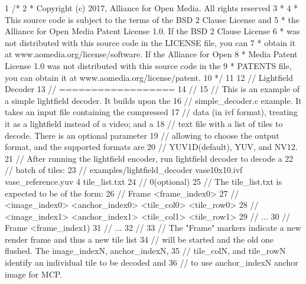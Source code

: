 \begin{DoxyCodeInclude}
1 \textcolor{comment}{/*}
2 \textcolor{comment}{ * Copyright (c) 2017, Alliance for Open Media. All rights reserved}
3 \textcolor{comment}{ *}
4 \textcolor{comment}{ * This source code is subject to the terms of the BSD 2 Clause License and}
5 \textcolor{comment}{ * the Alliance for Open Media Patent License 1.0. If the BSD 2 Clause License}
6 \textcolor{comment}{ * was not distributed with this source code in the LICENSE file, you can}
7 \textcolor{comment}{ * obtain it at www.aomedia.org/license/software. If the Alliance for Open}
8 \textcolor{comment}{ * Media Patent License 1.0 was not distributed with this source code in the}
9 \textcolor{comment}{ * PATENTS file, you can obtain it at www.aomedia.org/license/patent.}
10 \textcolor{comment}{ */}
11 
12 \textcolor{comment}{// Lightfield Decoder}
13 \textcolor{comment}{// ==================}
14 \textcolor{comment}{//}
15 \textcolor{comment}{// This is an example of a simple lightfield decoder. It builds upon the}
16 \textcolor{comment}{// simple\_decoder.c example.  It takes an input file containing the compressed}
17 \textcolor{comment}{// data (in ivf format), treating it as a lightfield instead of a video; and a}
18 \textcolor{comment}{// text file with a list of tiles to decode. There is an optional parameter}
19 \textcolor{comment}{// allowing to choose the output format, and the supported formats are}
20 \textcolor{comment}{// YUV1D(default), YUV, and NV12.}
21 \textcolor{comment}{// After running the lightfield encoder, run lightfield decoder to decode a}
22 \textcolor{comment}{// batch of tiles:}
23 \textcolor{comment}{// examples/lightfield\_decoder vase10x10.ivf vase\_reference.yuv 4 tile\_list.txt}
24 \textcolor{comment}{// 0(optional)}
25 \textcolor{comment}{// The tile\_list.txt is expected to be of the form:}
26 \textcolor{comment}{// Frame <frame\_index0>}
27 \textcolor{comment}{// <image\_index0> <anchor\_index0> <tile\_col0> <tile\_row0>}
28 \textcolor{comment}{// <image\_index1> <anchor\_index1> <tile\_col1> <tile\_row1>}
29 \textcolor{comment}{// ...}
30 \textcolor{comment}{// Frame <frame\_index1)}
31 \textcolor{comment}{// ...}
32 \textcolor{comment}{//}
33 \textcolor{comment}{// The "Frame" markers indicate a new render frame and thus a new tile list}
34 \textcolor{comment}{// will be started and the old one flushed.  The image\_indexN, anchor\_indexN,}
35 \textcolor{comment}{// tile\_colN, and tile\_rowN identify an individual tile to be decoded and}
36 \textcolor{comment}{// to use anchor\_indexN anchor image for MCP.}

\end{DoxyCodeInclude}
